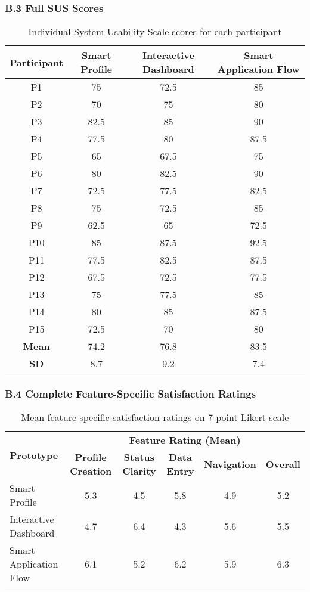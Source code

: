 \documentclass[
	letterpaper, %
]{jdf}
\begin{document}
\begin{sloppypar}
\subsubsection{B.3 Full SUS Scores}
\begin{table}[h]
\centering
\begin{tabular}{|c|c|c|c|}
\hline
\textbf{Participant} & \textbf{Smart Profile} & \textbf{Interactive Dashboard} & \textbf{Smart Application Flow} \\
\hline
P1 & 75 & 72.5 & 85 \\
\hline
P2 & 70 & 75 & 80 \\
\hline
P3 & 82.5 & 85 & 90 \\
\hline
P4 & 77.5 & 80 & 87.5 \\
\hline
P5 & 65 & 67.5 & 75 \\
\hline
P6 & 80 & 82.5 & 90 \\
\hline
P7 & 72.5 & 77.5 & 82.5 \\
\hline
P8 & 75 & 72.5 & 85 \\
\hline
P9 & 62.5 & 65 & 72.5 \\
\hline
P10 & 85 & 87.5 & 92.5 \\
\hline
P11 & 77.5 & 82.5 & 87.5 \\
\hline
P12 & 67.5 & 72.5 & 77.5 \\
\hline
P13 & 75 & 77.5 & 85 \\
\hline
P14 & 80 & 85 & 87.5 \\
\hline
P15 & 72.5 & 70 & 80 \\
\hline
\textbf{Mean} & 74.2 & 76.8 & 83.5 \\
\hline
\textbf{SD} & 8.7 & 9.2 & 7.4 \\
\hline
\end{tabular}
\caption{Individual System Usability Scale scores for each participant}
\end{table}

\subsubsection{B.4 Complete Feature-Specific Satisfaction Ratings}

\begin{table}[h]
\centering
\begin{tabular}{|l|c|c|c|c|c|}
\hline
\multirow{2}{*}{\textbf{Prototype}} & \multicolumn{5}{c|}{\textbf{Feature Rating (Mean)}} \\
\cline{2-6}
 & \textbf{Profile Creation} & \textbf{Status Clarity} & \textbf{Data Entry} & \textbf{Navigation} & \textbf{Overall} \\
\hline
Smart Profile & 5.3 & 4.5 & 5.8 & 4.9 & 5.2 \\
\hline
Interactive Dashboard & 4.7 & 6.4 & 4.3 & 5.6 & 5.5 \\
\hline
Smart Application Flow & 6.1 & 5.2 & 6.2 & 5.9 & 6.3 \\
\hline
\end{tabular}
\caption{Mean feature-specific satisfaction ratings on 7-point Likert scale}
\end{table}


\end{sloppypar}
\end{document}
